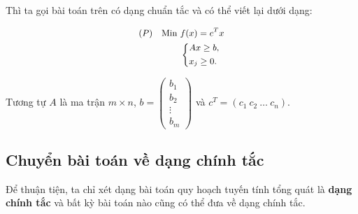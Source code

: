\documentclass[12pt,a4paper]{report}
\begin{document}
\begin{itemize}
    Thì ta gọi bài toán trên có dạng chuẩn tắc và có thể viết lại dưới dạng:

    \begin{equation} \small \label{F}
        \begin{split}
        (P) \quad \text{Min } & f(x) = c^Tx \\
            & \left\{
            \begin{split}
            & Ax \geq b, \\
            & x_j \geq 0.
            \end{split}
            \right.    
        \end{split}
    \end{equation}

    Tương tự $A$ là ma trận $m\times n$, $b=\begin{pmatrix}
        b_1 \\
        b_2 \\
        \vdots \\
        b_m
        \end{pmatrix}$ và $c^T=(c_1 \: c_2 \: \ldots \: c_n)$.

\end{itemize}

\subsection{Chuyển bài toán về dạng chính tắc}

Để thuận tiện, ta chỉ xét dạng bài toán quy hoạch tuyến tính tổng quát là \textbf{dạng chính tắc} và bất kỳ bài toán nào cũng có thể đưa về dạng chính tắc.
\end{document}
